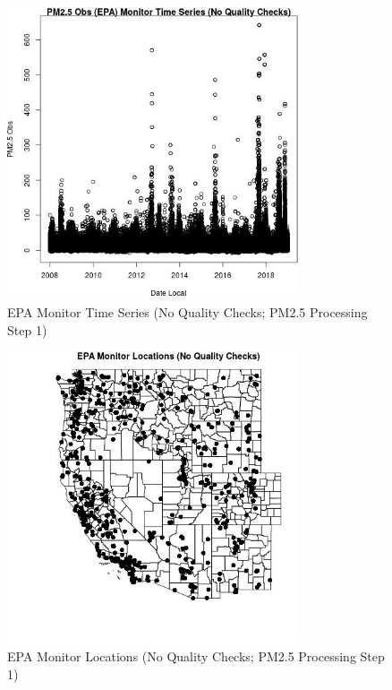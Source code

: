 
\begin{figure} 
\centering  
\includegraphics[width=0.77\textwidth]{Code_Outputs/PM25Source1TSstep1_PM25_ObsvDate_Local.jpg} 
\caption{\label{fig:PM25Source1TSstep1PM25_ObsvDate_Local}EPA Monitor Time Series (No Quality Checks; PM2.5 Processing Step 1)} 
\end{figure} 
 

\begin{figure} 
\centering  
\includegraphics[width=0.77\textwidth]{Code_Outputs/PM25Source1TSstep1_MapEPALocations.jpg} 
\caption{\label{fig:PM25Source1TSstep1MapEPALocations}EPA Monitor Locations (No Quality Checks; PM2.5 Processing Step 1)} 
\end{figure} 
 
